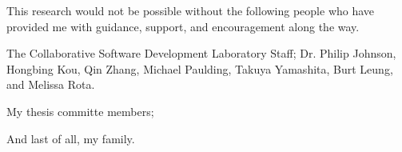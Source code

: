 
\begin{acknowledgments}
This research would not be possible without the following people who have
provided me with guidance, support, and encouragement along the way.

The Collaborative Software Development Laboratory Staff; Dr. Philip Johnson, Hongbing
Kou, Qin Zhang, Michael Paulding, Takuya Yamashita, Burt Leung, and Melissa 
Rota. 

My thesis committe members;

And last of all, my family.

\end{acknowledgments}

